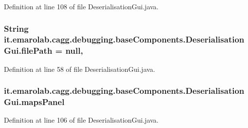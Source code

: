 Definition at line 108 of file Deserialisation\-Gui.\-java.

\hypertarget{classit_1_1emarolab_1_1cagg_1_1debugging_1_1baseComponents_1_1DeserialisationGui_a399911d5a8594940a095db4753563a0d}{
\subsubsection[{file\-Path}]{\setlength{\rightskip}{0pt plus 5cm}String it.\-emarolab.\-cagg.\-debugging.\-base\-Components.\-Deserialisation\-Gui.\-file\-Path = null\hspace{0.3cm}{\ttfamily [static]}, {\ttfamily [private]}}}\label{classit_1_1emarolab_1_1cagg_1_1debugging_1_1baseComponents_1_1DeserialisationGui_a399911d5a8594940a095db4753563a0d}


Definition at line 58 of file Deserialisation\-Gui.\-java.

\hypertarget{classit_1_1emarolab_1_1cagg_1_1debugging_1_1baseComponents_1_1DeserialisationGui_aff1c04b39963b4abefad3b89518f526a}{
\subsubsection[{maps\-Panel}]{ it.\-emarolab.\-cagg.\-debugging.\-base\-Components.\-Deserialisation\-Gui.\-maps\-Panel\hspace{0.3cm}{\ttfamily [private]}}}\label{classit_1_1emarolab_1_1cagg_1_1debugging_1_1baseComponents_1_1DeserialisationGui_aff1c04b39963b4abefad3b89518f526a}


Definition at line 106 of file Deserialisation\-Gui.\-java.


